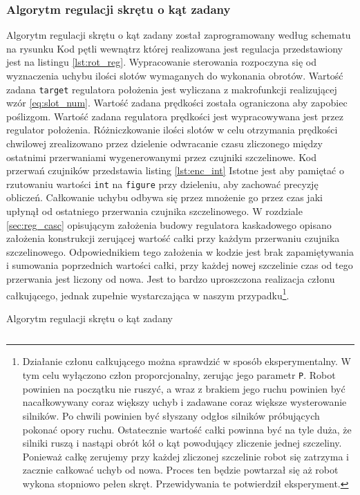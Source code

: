 \documentclass[11pt]{article}
\begin{document}
\subsubsection{Algorytm regulacji skrętu o kąt zadany}
Algorytm regulacji skrętu o kąt zadany został zaprogramowany według schematu na rysunku %
Kod pętli wewnątrz której realizowana jest regulacja przedstawiony jest na listingu \ref{lst:rot_reg}.
Wypracowanie sterowania rozpoczyna się od wyznaczenia uchybu ilości slotów wymaganych do wykonania obrotów.
Wartość zadana \texttt{target} regulatora położenia jest wyliczana z makrofunkcji realizującej wzór \ref{eq:slot_num}.
Wartość zadana prędkości została ograniczona aby zapobiec poślizgom.
Wartość zadana regulatora prędkości jest wypracowywana jest przez regulator położenia.
Różniczkowanie ilości slotów w celu otrzymania prędkości chwilowej zrealizowano przez dzielenie odwracanie czasu zliczonego między ostatnimi przerwaniami wygenerowanymi przez czujniki szczelinowe.
Kod przerwań czujników przedstawia listing \ref{lst:enc_int}
Istotne jest aby pamiętać o rzutowaniu wartości \texttt{int} na \texttt{figure} przy dzieleniu, aby zachować precyzję obliczeń.
Całkowanie uchybu odbywa się przez mnożenie go przez czas jaki upłynął od ostatniego przerwania czujnika szczelinowego.
W rozdziale \ref{sec:reg_casc} opisującym założenia budowy regulatora kaskadowego opisano założenia konstrukcji zerującej wartość całki przy każdym przerwaniu czujnika szczelinowego.
Odpowiednikiem tego założenia w kodzie jest brak zapamiętywania i sumowania poprzednich wartości całki, przy każdej nowej szczelinie czas od tego przerwania jest liczony od nowa.
Jest to bardzo uproszczona realizacja członu całkującego, jednak zupełnie wystarczająca w naszym przypadku\footnote{
	Działanie członu całkującego można sprawdzić w sposób eksperymentalny.
	W tym celu wyłączono człon proporcjonalny, zerując jego parametr \texttt{P}.
	Robot powinien na początku nie ruszyć, a wraz z brakiem jego ruchu powinien być nacałkowywany coraz większy uchyb i zadawane coraz większe wysterowanie silników.
	Po chwili powinien być słyszany odgłos silników próbujących pokonać opory ruchu.
	Ostatecznie wartość całki powinna być na tyle duża, że silniki ruszą i nastąpi obrót kół o kąt powodujący zliczenie jednej szczeliny.
	Ponieważ całkę zerujemy przy każdej zliczonej szczelinie robot się zatrzyma i zacznie całkować uchyb od nowa.
	Proces ten będzie powtarzał się aż robot wykona stopniowo pełen skręt.
	Przewidywania te potwierdził eksperyment.
}.


\begin{listing}[htbp]
\caption{Algorytm regulacji skrętu o kąt zadany}
\inputminted[firstline=85, lastline=126, frame=lines, linenos, breaklines, fontsize=\small ]{cpp}{../src/platformMotors.cpp}
\label{lst:rot_reg}
\end{listing}
\end{document}

